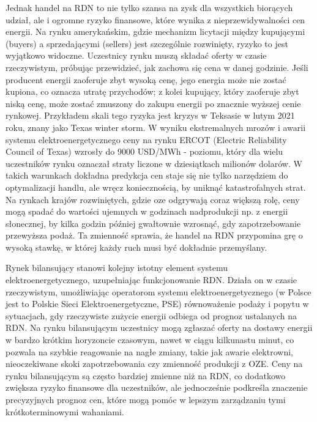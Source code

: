 Jednak handel na RDN to nie tylko szansa na zysk dla wszystkich biorących udział, ale i ogromne ryzyko finansowe, które wynika z nieprzewidywalności cen energii. Na rynku amerykańskim, gdzie mechanizm licytacji między kupującymi (buyers) a sprzedającymi (sellers) jest szczególnie rozwinięty, ryzyko to jest wyjątkowo widoczne. Uczestnicy rynku muszą składać oferty w czasie rzeczywistym, próbując przewidzieć, jak zachowa się cena w danej godzinie. Jeśli producent energii zaoferuje zbyt wysoką cenę, jego energia może nie zostać kupiona, co oznacza utratę przychodów; z kolei kupujący, który zaoferuje zbyt niską cenę, może zostać zmuszony do zakupu energii po znacznie wyższej cenie rynkowej. Przykładem skali tego ryzyka jest kryzys w Teksasie \cite{BUSBY2021102106} w lutym 2021 roku, znany jako Texas winter storm. W wyniku ekstremalnych mrozów i awarii systemu elektroenergetycznego ceny na rynku ERCOT (Electric Reliability Council of Texas) wzrosły do 9000 USD/MWh - poziomu, który dla wielu uczestników rynku oznaczał straty liczone w dziesiątkach milionów dolarów. W takich warunkach dokładna predykcja cen staje się nie tylko narzędziem do optymalizacji handlu, ale wręcz koniecznością, by uniknąć katastrofalnych strat. Na rynkach krajów rozwiniętych, gdzie \gls{oze} odgrywają coraz większą rolę, ceny mogą spadać do wartości ujemnych w godzinach nadprodukcji np. z energii słonecznej, by kilka godzin później gwałtownie wzrosnąć, gdy zapotrzebowanie przewyższa podaż. Ta zmienność sprawia, że handel na RDN przypomina grę o wysoką stawkę, w której każdy ruch musi być dokładnie przemyślany.

Rynek bilansujący stanowi kolejny istotny element systemu elektroenergetycznego, uzupełniając funkcjonowanie RDN. Działa on w czasie rzeczywistym, umożliwiając operatorom systemu elektroenergetycznego (w Polsce jest to Polskie Sieci Elektroenergetyczne, PSE) równoważenie podaży i popytu w sytuacjach, gdy rzeczywiste zużycie energii odbiega od prognoz ustalanych na RDN. Na rynku bilansującym uczestnicy mogą zgłaszać oferty na dostawy energii w bardzo krótkim horyzoncie czasowym, nawet w ciągu kilkunastu minut, co pozwala na szybkie reagowanie na nagłe zmiany, takie jak awarie elektrowni, nieoczekiwane skoki zapotrzebowania czy zmienność produkcji z OZE. Ceny na rynku bilansującym są często bardziej zmienne niż na RDN, co dodatkowo zwiększa ryzyko finansowe dla uczestników, ale jednocześnie podkreśla znaczenie precyzyjnych prognoz cen, które mogą pomóc w lepszym zarządzaniu tymi krótkoterminowymi wahaniami.


